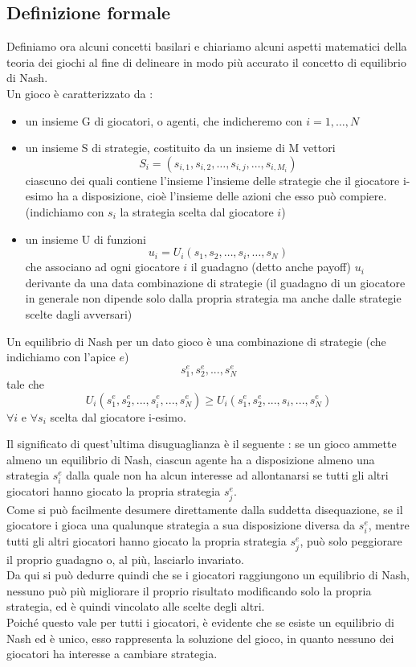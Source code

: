 \subsection{Definizione formale}
\justify
Definiamo ora alcuni concetti basilari e chiariamo alcuni aspetti matematici della teoria dei giochi al fine di delineare in modo più accurato il concetto di equilibrio di Nash.\\
Un gioco è caratterizzato da :
\begin{itemize}
	\item un insieme G di giocatori, o agenti, che indicheremo con \(i = 1,\ldots,N\)
	\item un insieme S di strategie, costituito da un insieme di M vettori \[S_{i}=\left(s_{{i,1}},s_{{i,2}},\ldots,s_{{i,j}},\ldots,s_{{i,M_{i}}}\right)\] ciascuno dei quali contiene l'insieme l'insieme delle strategie che il giocatore i-esimo ha a disposizione, cioè l'insieme delle azioni che esso può compiere.\\(indichiamo con \(s_i\) la strategia scelta dal giocatore \(i\))
	\item un insieme U di funzioni \[u_{i}=U_{i}\left(s_{1},s_{2},\ldots,s_{i},\ldots,s_{N}\right)\] che associano ad ogni giocatore \(i\) il guadagno (detto anche payoff) \(u_i\) derivante da una data combinazione di strategie (il guadagno di un giocatore in generale non dipende solo dalla propria strategia ma anche dalle strategie scelte dagli avversari)
\end{itemize}
Un equilibrio di Nash per un dato gioco è una combinazione di strategie (che indichiamo con l'apice \(e\))
\[s_{1}^{e},s_{2}^{e},...,s_{N}^{e}\]
tale che
\[U_{i}\left(s_{1}^{e},s_{2}^{e},...,s_{i}^{e},...,s_{N}^{e}\right)\geq U_{i}\left(s_{1}^{e},s_{2}^{e},...,s_{i},...,s_{N}^{e}\right)\]
\(\forall i\) e \(\forall s_i\) scelta dal giocatore i-esimo.\newline

Il significato di quest'ultima disuguaglianza è il seguente : se un gioco ammette almeno un equilibrio di Nash, ciascun agente ha a disposizione almeno una strategia \(s_i^e\) dalla quale non ha alcun interesse ad allontanarsi se tutti gli altri giocatori hanno giocato la propria strategia \(s_j^e\).\\
Come si può facilmente desumere direttamente dalla suddetta disequazione, se il giocatore i gioca una qualunque strategia a sua disposizione diversa da \(s_i^e\), mentre tutti gli altri giocatori hanno giocato la propria strategia \(s_j^e\), può solo peggiorare il proprio guadagno o, al più, lasciarlo invariato.\\
Da qui si può dedurre quindi che se i giocatori raggiungono un equilibrio di Nash, nessuno può più migliorare il proprio risultato modificando solo la propria strategia, ed è quindi vincolato alle scelte degli altri.\\
Poiché questo vale per tutti i giocatori, è evidente che se esiste un equilibrio di Nash ed è unico, esso rappresenta la soluzione del gioco, in quanto nessuno dei giocatori ha interesse a cambiare strategia.\newline


